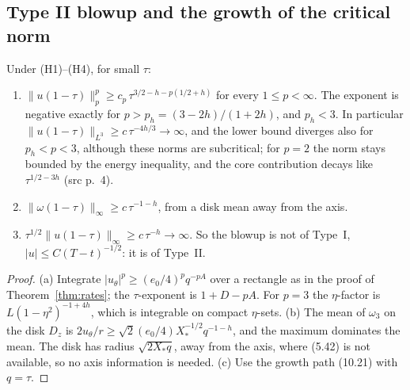 \subsection{Type II blowup and the growth of the critical norm}

\begin{proposition}\label{prop:typeII}
Under (H1)--(H4), for small $\tau$:
\begin{enumerate}[label=(\alph*)]
\item $\|u(1-\tau)\|_p^p\ge c_p\,\tau^{3/2-h-p(1/2+h)}$ for every $1\le p<\infty$. The exponent is negative exactly for $p>p_h=(3-2h)/(1+2h)$, and $p_h<3$. In particular $\|u(1-\tau)\|_{L^3}\ge c\,\tau^{-4h/3}\to\infty$, and the lower bound diverges also for $p_h<p<3$, although these norms are subcritical; for $p=2$ the norm stays bounded by the energy inequality, and the core contribution decays like $\tau^{1/2-3h}$ (src p.~4).
\item $\|\omega(1-\tau)\|_\infty\ge c\,\tau^{-1-h}$, from a disk mean away from the axis.
\item $\tau^{1/2}\|u(1-\tau)\|_\infty\ge c\,\tau^{-h}\to\infty$. So the blowup is not of Type~I, $|u|\le C(T-t)^{-1/2}$: it is of Type~II.
\end{enumerate}
\end{proposition}
\begin{proof}
(a) Integrate $|u_\theta|^p\ge(e_0/4)^pq^{-pA}$ over a rectangle as in the proof of Theorem~\ref{thm:rates}; the $\tau$-exponent is $1+D-pA$. For $p=3$ the $\eta$-factor is $L(1-\eta^2)^{-1+4h}$, which is integrable on compact $\eta$-sets.
(b) The mean of $\omega_3$ on the disk $D_z$ is $2u_\theta/r\ge\sqrt2(e_0/4)X_*^{-1/2}q^{-1-h}$, and the maximum dominates the mean. The disk has radius $\sqrt{2X_*q}$, away from the axis, where (5.42) is not available, so no axis information is needed.
(c) Use the growth path (10.21) with $q=\tau$.
\end{proof}

